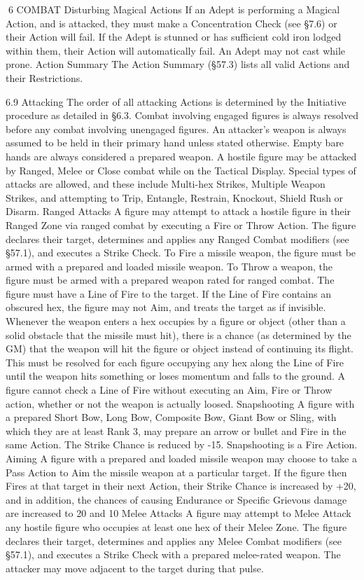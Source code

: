 \documentclass[a4paper]{article}
\begin{document}
\begin{multicols}{3}
6 COMBAT
Disturbing Magical Actions
If an Adept is performing a Magical Action, and is
attacked, they must make a Concentration Check
(see §7.6) or their Action will fail. If the Adept is
stunned or has sufficient cold iron lodged within
them, their Action will automatically fail. An
Adept may not cast while prone.
Action Summary
The Action Summary (§57.3) lists all valid Actions
and their Restrictions.

6.9 Attacking
The order of all attacking Actions is determined by
the Initiative procedure as detailed in §6.3. Combat
involving engaged figures is always resolved before any combat involving unengaged figures. An
attacker’s weapon is always assumed to be held in
their primary hand unless stated otherwise. Empty
bare hands are always considered a prepared
weapon.
A hostile figure may be attacked by Ranged, Melee
or Close combat while on the Tactical Display.
Special types of attacks are allowed, and these
include Multi-hex Strikes, Multiple Weapon
Strikes, and attempting to Trip, Entangle, Restrain,
Knockout, Shield Rush or Disarm.
Ranged Attacks
A figure may attempt to attack a hostile figure in
their Ranged Zone via ranged combat by executing
a Fire or Throw Action. The figure declares their
target, determines and applies any Ranged Combat
modifiers (see §57.1), and executes a Strike Check.
To Fire a missile weapon, the figure must be armed
with a prepared and loaded missile weapon. To
Throw a weapon, the figure must be armed with a
prepared weapon rated for ranged combat. The
figure must have a Line of Fire to the target. If the
Line of Fire contains an obscured hex, the figure
may not Aim, and treats the target as if invisible.
Whenever the weapon enters a hex occupies by a
figure or object (other than a solid obstacle that the
missile must hit), there is a chance (as determined
by the GM) that the weapon will hit the figure or
object instead of continuing its flight. This must be
resolved for each figure occupying any hex along
the Line of Fire until the weapon hits something or
loses momentum and falls to the ground.
A figure cannot check a Line of Fire without executing an Aim, Fire or Throw action, whether or
not the weapon is actually loosed.
Snapshooting A figure with a prepared Short Bow,
Long Bow, Composite Bow, Giant Bow or Sling,
with which they are at least Rank 3, may prepare
an arrow or bullet and Fire in the same Action. The
Strike Chance is reduced by -15. Snapshooting is a
Fire Action.
Aiming A figure with a prepared and loaded missile weapon may choose to take a Pass Action to
Aim the missile weapon at a particular target. If the
figure then Fires at that target in their next Action,
their Strike Chance is increased by +20, and in
addition, the chances of causing Endurance or
Specific Grievous damage are increased to 20%
and 10%
Melee Attacks
A figure may attempt to Melee Attack any hostile
figure who occupies at least one hex of their Melee
Zone. The figure declares their target, determines
and applies any Melee Combat modifiers (see
§57.1), and executes a Strike Check with a prepared melee-rated weapon. The attacker may move
adjacent to the target during that pulse.


\end{multicols}
\end{document}
